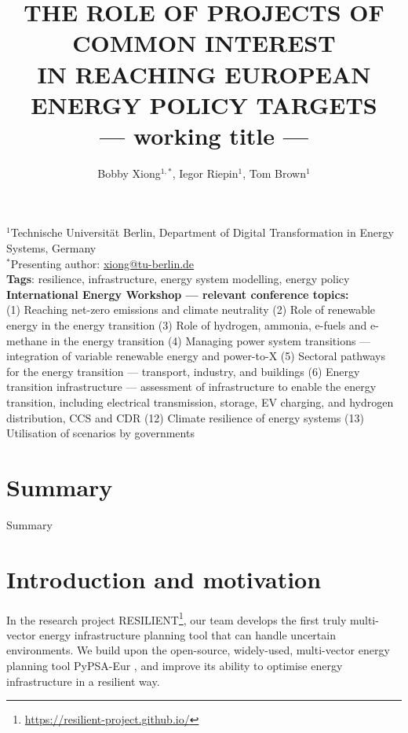\documentclass[10pt]{article}
\title{\renewcommand{\baselinestretch}{1.17}\normalsize\bf%
\uppercase{The Role of Projects of Common Interest\\in Reaching European Energy Policy Targets}\\--- working title ---
}
\author{%
Bobby Xiong$^{1,*}$, Iegor Riepin$^{1}$, Tom Brown$^{1}$\\ 
}
\date{}
\let\autocite\cite
\begin{document}
\maketitle

\vspace{-1cm}

\begin{center}
{\footnotesize 
$^1$Technische Universität Berlin, Department of Digital Transformation in Energy Systems, Germany \\
$^*$Presenting author: \href{mailto:xiong@tu-berlin.de}{xiong@tu-berlin.de}
}\\
\smallskip
\footnotesize
\textbf{Tags}: resilience, infrastructure, energy system modelling, energy policy \\
\medskip
\textbf{ International Energy Workshop --- relevant conference topics:}\\(1) Reaching net-zero emissions and climate neutrality \textbullet{} (2) Role of renewable energy in the energy transition \textbullet{} (3) Role of hydrogen, ammonia, e-fuels and e-methane in the energy transition \textbullet{} (4) Managing power system transitions --- integration of variable renewable energy and power-to-X \textbullet{} (5) Sectoral pathways for the energy transition --- transport, industry, and buildings \textbullet{} (6) Energy transition infrastructure --- assessment of infrastructure to enable the energy transition, including electrical transmission, storage, EV charging, and hydrogen distribution, CCS and CDR \textbullet{} (12) Climate resilience of energy systems \textbullet{} (13) Utilisation of scenarios by governments
\end{center}


\section*{Summary}

Summary

\section*{Introduction and motivation}

In the research project RESILIENT\footnote{\href{https://resilient-project.github.io/}{https://resilient-project.github.io/}}, our team develops the first truly multi-vector energy infrastructure planning tool that can handle uncertain environments. We build upon the open-source, widely-used, multi-vector energy planning tool PyPSA-Eur \autocite{horschPyPSAEurOpenOptimisation2018}, and improve its ability to optimise energy infrastructure in a resilient way. 
\end{document}
